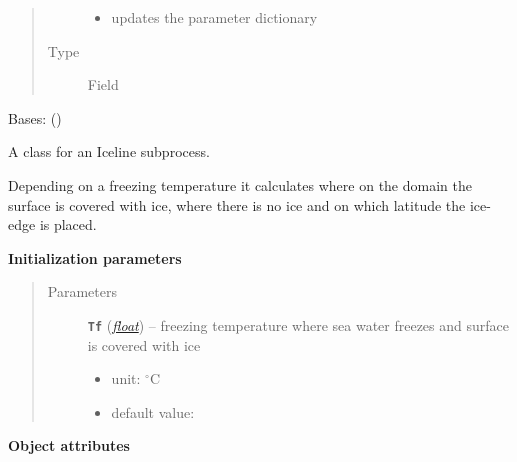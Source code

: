 \documentclass[a4paper,10pt,english]{sphinxmanual}
\begin{document}
\begin{fulllineitems}
\begin{fulllineitems}
\begin{quote}
\begin{description}
\begin{itemize}
\item {} 
updates the parameter dictionary 

\end{itemize}

\item[{Type}] \leavevmode
Field

\end{description}\end{quote}

\end{fulllineitems}


\end{fulllineitems}


\begin{fulllineitems}
\label{api/climlab.surface:climlab.surface.albedo.Iceline}
Bases: {\hyperref[api/climlab.process:climlab.process.diagnostic.DiagnosticProcess]{\emph{}}} ()

A class for an Iceline subprocess.

Depending on a freezing temperature it calculates where on the domain the
surface is covered with ice, where there is no ice and on which latitude the ice-edge 
is placed.

\textbf{Initialization parameters}
\begin{quote}\begin{description}
\item[{Parameters}] \leavevmode
\textbf{\texttt{Tf}} (\href{http://docs.python.org/2.7/library/functions.html\#float}{\emph{float}}) -- 
freezing temperature where sea water freezes and
surface is covered with ice
\begin{itemize}
\item {} 
unit: \(^{\circ} \textrm{C}\)

\item {} 
default value: 

\end{itemize}


\end{description}\end{quote}

\textbf{Object attributes}


\end{fulllineitems}
\end{document}
